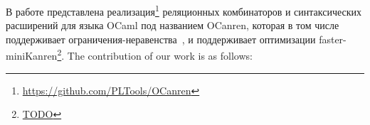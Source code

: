 
В работе представлена реализация\footnote{\url{https://github.com/PLTools/OCanren}} реляционных комбинаторов и синтаксических расширений для языка OCaml под названием OCanren,
которая в том числе поддерживает ограничения-неравенства~\cite{CKanren}, и поддерживает оптимизации faster-miniKanren\footnote{\url{TODO}}.
The contribution of our work is as follows:

